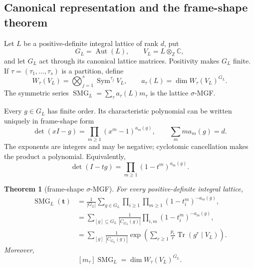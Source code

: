 \documentclass[10pt]{article}
\newcommand{\Sym}{\operatorname{Sym}}
\newcommand{\Tr}{\operatorname{Tr}}
\newcommand{\SMG}{\operatorname{SMG}}
\newcommand{\MGF}{\SMG}
\newcommand{\C}{\mathbb C}
\newcommand{\Z}{\mathbb Z}
\newcommand{\Aut}{\operatorname{Aut}}
\newtheorem{theorem}{Theorem}
\begin{document}
\subsection{Canonical representation and the frame-shape theorem}

Let $L$ be a positive-definite integral lattice of rank $d$, put
\[
 G_L=\Aut(L),\qquad V_L=L\otimes_{\Z}\C,
\]
and let $G_L$ act through its canonical lattice matrices.  Positivity makes
$G_L$ finite.  If $\tau=(\tau_1,\ldots,\tau_s)$ is a partition, define
\[
 W_\tau(V_L)=\bigotimes_{j=1}^s\Sym^{\tau_j}V_L,
 \qquad a_\tau(L)=\dim W_\tau(V_L)^{G_L}.
\]
The symmetric series $\MGF_L=\sum_\tau a_\tau(L)m_\tau$ is the lattice
$\sigma$-MGF.

Every $g\in G_L$ has finite order.  Its characteristic polynomial can be
written uniquely in frame-shape form
\begin{equation}\label{nd:lattices:eq:frame}
 \det(xI-g)=\prod_{m\ge1}(x^m-1)^{a_m(g)},
 \qquad \sum_m m a_m(g)=d.
\end{equation}
The exponents are integers and may be negative; cyclotomic cancellation makes
the product a polynomial.  Equivalently,
\begin{equation}\label{nd:lattices:eq:frame-det}
 \det(I-tg)=\prod_{m\ge1}(1-t^m)^{a_m(g)}.
\end{equation}

\begin{theorem}[frame-shape $\sigma$-MGF]\label{nd:lattices:thm:frame}
For every positive-definite integral lattice,
\begin{align}
 \MGF_L(\mathbf t)
 &=\frac1{|G_L|}\sum_{g\in G_L}
   \prod_{i\ge1}\prod_{m\ge1}(1-t_i^m)^{-a_m(g)},
   \label{nd:lattices:eq:element-frame}\\
 &=\sum_{[g]\subseteq G_L}\frac1{|C_{G_L}(g)|}
   \prod_{i,m}(1-t_i^m)^{-a_m(g)},\label{nd:lattices:eq:class-frame}\\
 &=\sum_{[g]}\frac1{|C_{G_L}(g)|}
   \exp\!\left(\sum_{r\ge1}\frac{p_r}{r}\Tr(g^r\mid V_L)\right).
   \label{nd:lattices:eq:trace-frame}
\end{align}
Moreover,
\begin{equation}\label{nd:lattices:eq:coefficient}
 \boxed{[m_\tau]\MGF_L=\dim W_\tau(V_L)^{G_L}.}
\end{equation}
\end{theorem}
\end{document}

